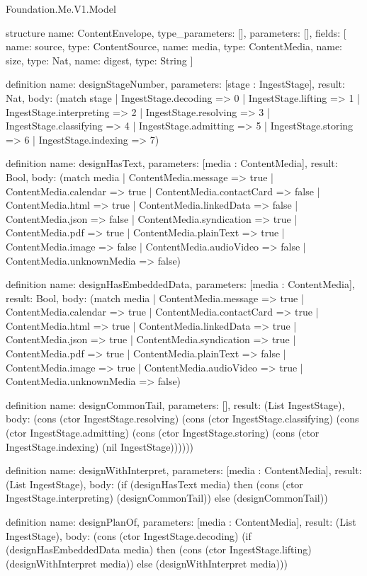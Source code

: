 \begin{lexlean}{Foundation.Me.V1.Model}
\begin{semanticmodule}
structure{
  name: ContentEnvelope,
  type_parameters: [],
  parameters: [],
  fields: [
    {name: source, type: ContentSource},
    {name: media, type: ContentMedia},
    {name: size, type: Nat},
    {name: digest, type: String}
  ]
}

definition{
  name: designStageNumber,
  parameters: [stage : IngestStage],
  result: Nat,
  body: (match stage
    | IngestStage.decoding => 0
    | IngestStage.lifting => 1
    | IngestStage.interpreting => 2
    | IngestStage.resolving => 3
    | IngestStage.classifying => 4
    | IngestStage.admitting => 5
    | IngestStage.storing => 6
    | IngestStage.indexing => 7)
}

definition{
  name: designHasText,
  parameters: [media : ContentMedia],
  result: Bool,
  body: (match media
    | ContentMedia.message => true
    | ContentMedia.calendar => true
    | ContentMedia.contactCard => false
    | ContentMedia.html => true
    | ContentMedia.linkedData => false
    | ContentMedia.json => false
    | ContentMedia.syndication => true
    | ContentMedia.pdf => true
    | ContentMedia.plainText => true
    | ContentMedia.image => false
    | ContentMedia.audioVideo => false
    | ContentMedia.unknownMedia => false)
}

definition{
  name: designHasEmbeddedData,
  parameters: [media : ContentMedia],
  result: Bool,
  body: (match media
    | ContentMedia.message => true
    | ContentMedia.calendar => true
    | ContentMedia.contactCard => true
    | ContentMedia.html => true
    | ContentMedia.linkedData => true
    | ContentMedia.json => true
    | ContentMedia.syndication => true
    | ContentMedia.pdf => true
    | ContentMedia.plainText => false
    | ContentMedia.image => true
    | ContentMedia.audioVideo => true
    | ContentMedia.unknownMedia => false)
}

definition{
  name: designCommonTail,
  parameters: [],
  result: (List IngestStage),
  body: (cons (ctor IngestStage.resolving) (cons (ctor IngestStage.classifying) (cons (ctor IngestStage.admitting) (cons (ctor IngestStage.storing) (cons (ctor IngestStage.indexing) (nil IngestStage))))))
}

definition{
  name: designWithInterpret,
  parameters: [media : ContentMedia],
  result: (List IngestStage),
  body: (if (designHasText media) then (cons (ctor IngestStage.interpreting) (designCommonTail)) else (designCommonTail))
}

definition{
  name: designPlanOf,
  parameters: [media : ContentMedia],
  result: (List IngestStage),
  body: (cons (ctor IngestStage.decoding) (if (designHasEmbeddedData media) then (cons (ctor IngestStage.lifting) (designWithInterpret media)) else (designWithInterpret media)))
}


\end{semanticmodule}
\end{lexlean}

